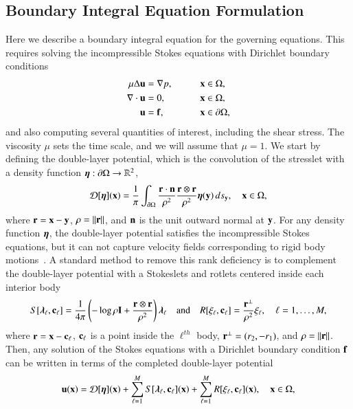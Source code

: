\documentclass[preprint, 10pt]{elsarticle}
\begin{document}
\subsection{Boundary Integral Equation Formulation} 
\label{sec:bies}
Here we describe a boundary integral equation for the governing
equations.   This requires solving the incompressible Stokes equations
with Dirichlet boundary conditions 
\begin{alignat*}{3}
  \mu\Delta {\mathbf{u}} &= {\nabla} p, \qquad && {\mathbf{x}} \in \Omega, \\
  {\nabla} \cdot {\mathbf{u}} &= 0,   && {\mathbf{x}} \in \Omega, \\
  {\mathbf{u}} &= {\mathbf{f}},  && {\mathbf{x}} \in {\partial}\Omega,
\end{alignat*}
and also computing several quantities of interest, including the shear
stress.  The viscosity $\mu$ sets the time scale, and we will assume
that $\mu=1$.  We start by defining the double-layer potential, which is
the convolution of the stresslet with a density function
${\boldsymbol\eta}:{\partial}\Omega \rightarrow {\mathbb{R}}^2$,
\begin{align}
  {\mathcal{D}}[{\boldsymbol\eta}]({\mathbf{x}}) = \frac{1}{\pi} \int_{{\partial}\Omega} 
    \frac{{\mathbf{r}} \cdot {\mathbf{n}}}{\rho^2} \frac{{\mathbf{r}} \otimes {\mathbf{r}}}{\rho^2} 
    {\boldsymbol\eta}({\mathbf{y}}) \, ds_{\mathbf{y}}, \quad {\mathbf{x}} \in \Omega,
    \label{eqn:velocityDLP}
\end{align}
where ${\mathbf{r}} = {\mathbf{x}} - {\mathbf{y}}$, $\rho = \|{\mathbf{r}}\|$, and ${\mathbf{n}}$ is the unit outward
normal at ${\mathbf{y}}$.  For any density function ${\boldsymbol\eta}$, the double-layer
potential satisfies the incompressible Stokes equations, but it can not
capture velocity fields corresponding to rigid body
motions~\cite{pow-mir1987}.  A standard method to remove this rank
deficiency is to complement the double-layer potential with a Stokeslets
and rotlets centered inside each interior body
\begin{align}
  S[{\boldsymbol\lambda}_\ell,{\mathbf{c}}_\ell] = \frac{1}{4\pi} \left(-\log \rho {\mathbf{I}} + 
    \frac{{\mathbf{r}} \otimes {\mathbf{r}}}{\rho^2} \right){\boldsymbol\lambda}_\ell
  \quad \text{and} \quad
  R[\xi_\ell,{\mathbf{c}}_\ell] = \frac{{\mathbf{r}}^\perp}{\rho^2}\xi_\ell, 
  \quad \ell=1,\ldots,M,
  \label{eqn:stokeslet_rotlet}
\end{align}
where  ${\mathbf{r}} = {\mathbf{x}} - {\mathbf{c}}_\ell$, ${\mathbf{c}}_\ell$ is a point inside the
$\ell^{th}$ body, ${\mathbf{r}}^\perp = (r_2,-r_1)$, and $\rho = \|{\mathbf{r}}\|$.  Then,
any solution of the Stokes equations with a Dirichlet boundary condition
${\mathbf{f}}$ can be written in terms of the completed double-layer potential
\begin{align}
  \label{eqn:completed_DLP}
  {\mathbf{u}}({\mathbf{x}}) = {\mathcal{D}}[{\boldsymbol\eta}]({\mathbf{x}}) + 
    \sum_{\ell=1}^{M} S[{\boldsymbol\lambda}_\ell,{\mathbf{c}}_\ell]({\mathbf{x}}) +
    \sum_{\ell=1}^{M} R[\xi_\ell,{\mathbf{c}}_\ell]({\mathbf{x}}), \quad {\mathbf{x}} \in \Omega,
\end{align}
\end{document}
